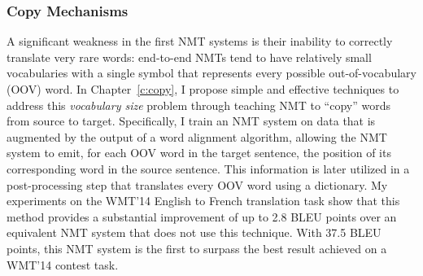 \subsubsection*{Copy Mechanisms} 
A significant weakness in the first NMT 
systems is their inability to correctly translate very rare words:  
end-to-end NMTs tend to have relatively small vocabularies with a single
\unk{} symbol that represents every possible out-of-vocabulary (OOV) word. In
Chapter~\ref{c:copy}, I propose simple and effective techniques to address this
{\it vocabulary size} problem through teaching NMT to ``copy'' words from source to
target. Specifically, I train an NMT system on data that is augmented by the output of a word 
alignment algorithm, allowing the NMT system to emit, for each OOV word
in the target sentence, the position of its corresponding word in the source sentence.
This information is later utilized in a
post-processing step that translates every OOV word using a dictionary. My 
experiments on the WMT'14 English to French translation task show that this 
method provides a substantial improvement of up to 2.8 BLEU points over an
equivalent NMT system that does not use this technique. 
With 37.5 BLEU points, this NMT system is the first to surpass 
the best result achieved on a WMT'14 contest task. 

